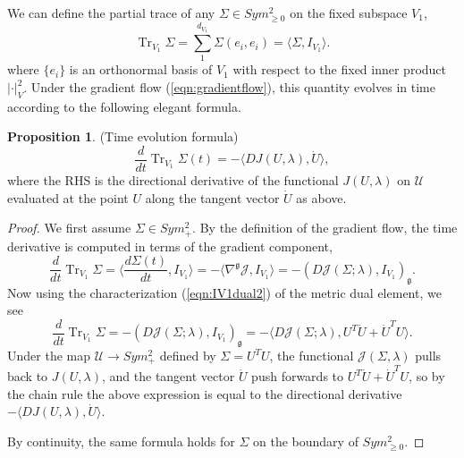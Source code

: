 \documentclass[a4paper]{article}
\theoremstyle{definition}
\newtheorem{prop}[thm]{Proposition}
\newcommand{\1}{\mathbbm{1}}
\DeclareMathOperator{\Tr}{Tr}
\begin{document}
	
	
	
	
	
	We can define the partial trace of any $\Sigma\in Sym^2_{\geq 0}$ on the fixed subspace $V_1$,
	\[
	\Tr_{V_1} \Sigma= \sum_1^{d_{V_1}} \Sigma(e_i, e_i)= \langle \Sigma, I_{V_1}\rangle.
	\]
	where $\{ e_i\}$ is an orthonormal basis of $V_1$ with respect to the fixed inner product $|\cdot|_V^2$. Under the gradient flow (\ref{eqn:gradientflow}), this quantity evolves in time according to the following elegant formula. 
	\begin{prop}\label{lem:timeevolution}
		(Time evolution formula)
		\begin{equation}\label{eqn:timeevolutionformulapartialtrace}
			\frac{d}{dt} \Tr_{V_1} \Sigma(t)= -\langle DJ(U,\lambda), \dot{U} \rangle,
		\end{equation}
		where the RHS is the directional derivative of the functional $J(U,\lambda)$ on $\mathcal{U}$ evaluated at the point $U$ along the tangent vector $\dot{U}$ as above. 
	\end{prop}
	
	
	
	
	
	
	
	
	
	
	
	
	
	
	
	\begin{proof}
		We first assume $\Sigma\in Sym^2_+$. 
		By the definition of the gradient flow, the time derivative is computed in terms of the gradient component,
		\[
		\frac{d}{dt} \Tr_{V_1} \Sigma= \langle \frac{d\Sigma(t) }{dt} , I_{V_1}\rangle= -\langle \nabla^{\mathfrak{g}} \mathcal{J}, I_{V_1}\rangle= -( D\mathcal{J}(\Sigma;\lambda), I_{V_1})_{\mathfrak{g}}.  
		\]
		Now using the characterization (\ref{eqn:IV1dual2}) of the metric dual element, we see
		\[
		\frac{d}{dt} \Tr_{V_1} \Sigma=  -( D\mathcal{J}(\Sigma;\lambda), I_{V_1})_{\mathfrak{g}}= - \langle D\mathcal{J}(\Sigma;\lambda), U^T \dot{U} + \dot{U}^T U\rangle. 
		\]
		Under the map $\mathcal{U}\to Sym^2_+$ defined by $\Sigma= U^T U$, the functional $\mathcal{J}(\Sigma, \lambda)$ pulls back to $J(U,\lambda)$, and the tangent vector $\dot{U}$ push forwards to $U^T \dot{U} + \dot{U}^T U$, so by the chain rule the above expression is equal to the directional derivative $-\langle DJ(U,\lambda), \dot{U} \rangle$. 
		
		
		By continuity, the same formula holds for $\Sigma$ on the boundary of $Sym^2_{\geq 0}$.
	\end{proof}
	
\end{document}
